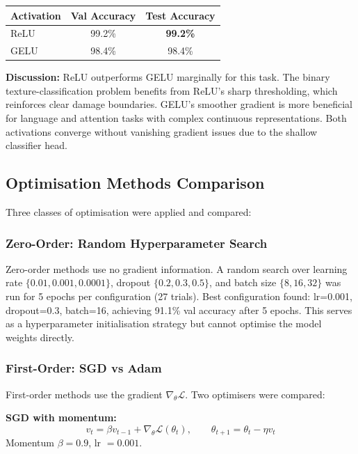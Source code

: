 \documentclass[10pt,twocolumn]{article}
\begin{document}
\begin{center}
\small
\begin{tabular}{lcc}
\toprule
\textbf{Activation} & \textbf{Val Accuracy} & \textbf{Test Accuracy} \\
\midrule
ReLU  & 99.2\% & \textbf{99.2\%} \\
GELU  & 98.4\% & 98.4\% \\
\bottomrule
\end{tabular}
\end{center}

\textbf{Discussion:} ReLU outperforms GELU marginally for this task. The binary texture-classification problem benefits from ReLU's sharp thresholding, which reinforces clear damage boundaries. GELU's smoother gradient is more beneficial for language and attention tasks with complex continuous representations. Both activations converge without vanishing gradient issues due to the shallow classifier head.

\subsection*{Optimisation Methods Comparison}

Three classes of optimisation were applied and compared:

\subsubsection*{Zero-Order: Random Hyperparameter Search}

Zero-order methods use no gradient information. A random search over learning rate $\{0.01, 0.001, 0.0001\}$, dropout $\{0.2, 0.3, 0.5\}$, and batch size $\{8, 16, 32\}$ was run for 5 epochs per configuration (27 trials). Best configuration found: lr=0.001, dropout=0.3, batch=16, achieving 91.1\% val accuracy after 5 epochs. This serves as a hyperparameter initialisation strategy but cannot optimise the model weights directly.

\subsubsection*{First-Order: SGD vs Adam}

First-order methods use the gradient $\nabla_\theta \mathcal{L}$. Two optimisers were compared:

\textbf{SGD with momentum:}
\[
v_t = \beta v_{t-1} + \nabla_\theta \mathcal{L}(\theta_t), \qquad \theta_{t+1} = \theta_t - \eta v_t
\]
Momentum $\beta = 0.9$, lr $= 0.001$.
\end{document}
